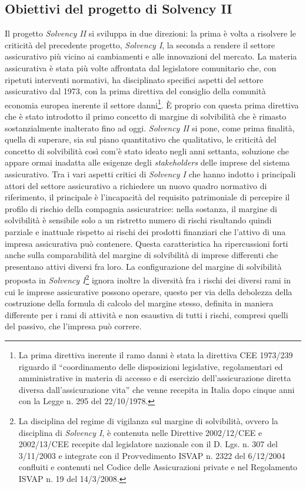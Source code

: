 \subsection{Obiettivi del progetto di Solvency II}
Il progetto \textit{\textit{Solvency I}I} si sviluppa in due direzioni: la prima è volta a risolvere le criticità del precedente progetto, \textit{Solvency I}, la seconda a rendere il settore assicurativo più vicino ai cambiamenti e alle innovazioni del mercato.
La materia assicurativa è stata più volte affrontata dal legislatore comunitario che, con ripetuti interventi normativi, ha disciplinato specifici aspetti del settore assicurativo dal 1973, con la prima direttiva del consiglio della comunità economia europea inerente il settore danni\footnote{La prima direttiva inerente il ramo danni è stata la direttiva CEE 1973/239 riguardo il “coordinamento delle disposizioni legislative, regolamentari ed amministrative in materia di accesso e di esercizio dell’assicurazione diretta diversa dall’assicurazione vita” che venne recepita in Italia dopo cinque anni con la Legge n. 295 del 22/10/1978.}. È proprio con questa prima direttiva che è stato introdotto il primo concetto di margine di solvibilità che è rimasto sostanzialmente inalterato fino ad oggi.
\textit{\textit{Solvency I}I} si pone, come prima finalità, quella di superare, sia sul piano quantitativo che qualitativo, le criticità del concetto di solvibilità così com’è stato ideato negli anni settanta, soluzione che appare ormai inadatta alle esigenze degli \textit{stakeholders} delle imprese del sistema assicurativo.
Tra i vari aspetti critici di \textit{Solvency I} che hanno indotto i principali attori del settore assicurativo a richiedere un nuovo quadro normativo di riferimento, il principale è l’incapacità del requisito patrimoniale di percepire il profilo di rischio della compagnia assicuratrice: nella sostanza, il margine di solvibilità è sensibile solo a un ristretto numero di rischi risultando quindi parziale e inattuale rispetto ai rischi dei prodotti finanziari che l’attivo di una impresa assicurativa può contenere. Questa caratteristica ha ripercussioni forti anche sulla comparabilità del margine di solvibilità di imprese differenti che presentano attivi diversi fra loro.
La configurazione del margine di solvibilità proposta in \textit{Solvency I}\footnote{La disciplina del regime di vigilanza sul margine di solvibilità, ovvero la disciplina di \textit{Solvency I}, è contenuta nelle Direttive 2002/12/CEE e 2002/13/CEE recepite dal legislatore nazionale con il D. Lgs. n. 307 del 3/11/2003 e integrate con il Provvedimento ISVAP n. 2322 del 6/12/2004 confluiti e contenuti nel Codice delle Assicurazioni private e nel Regolamento ISVAP n. 19 del 14/3/2008.} ignora inoltre la diversità fra i rischi dei diversi rami in cui le imprese assicurative possono operare, questo per via della debolezza della costruzione della formula di calcolo del margine stesso, definita in maniera differente per i rami di attività  e non esaustiva di tutti i rischi, compresi quelli del passivo, che l’impresa può correre. 
